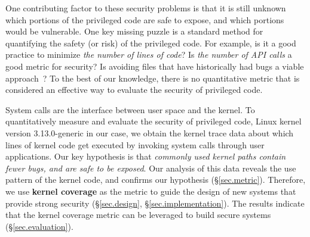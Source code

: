 One contributing factor to these security problems 
is that it is still unknown which portions of the privileged code are
safe to expose, and which portions would be vulnerable. 
One key missing puzzle is a standard method for quantifying the safety (or 
risk) of the privileged code. 
For example, is it a good practice to minimize \textit{the number of lines of code}?
Is \textit{the number of API calls} a good metric for security?   %
Is avoiding files that have historically had bugs a viable approach~\cite{lewis2013does}?
To the best of our knowledge, there is no quantitative metric that
is considered an effective way to evaluate the 
security of privileged code. 

System calls are the interface between user space and the kernel. 
To quantitatively measure and evaluate the security of privileged 
code, Linux kernel version 3.13.0-generic in our case, we 
obtain the kernel trace data about which lines of kernel code 
get executed by invoking system calls through user applications.  
Our key hypothesis is that \textit{commonly used kernel paths 
contain fewer bugs, and are safe to be exposed}. 
Our analysis of this data reveals the use pattern of the kernel code, 
and confirms our hypothesis (\S{\ref{sec.metric}}). Therefore, we use 
\textbf{kernel coverage} as the metric to guide the design of new 
systems that provide strong security (\S{\ref{sec.design}}, 
\S{\ref{sec.implementation}}). 
The results indicate that %
the kernel coverage metric can be leveraged to build secure systems
(\S{\ref{sec.evaluation}}). 

